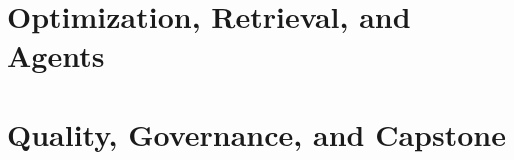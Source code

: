 \documentclass[graybox,envcountchap,sectrefs]{SNmono}
\begin{document}
\part{Optimization, Retrieval, and Agents}








\part{Quality, Governance, and Capstone}









\backmatter%



\printindex
\end{document}
